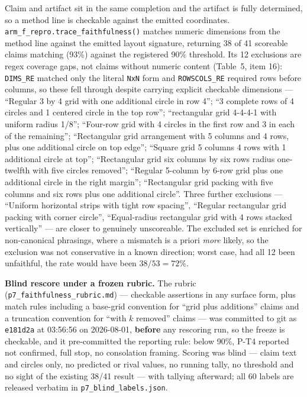 \documentclass[11pt]{article}
\begin{document}
Claim and artifact sit in the same completion and the artifact is fully determined, so a method
line is checkable against the emitted coordinates. \texttt{arm\_f\_repro.trace\_faithfulness()} matches
numeric dimensions from the method line against the emitted layout signature, returning 38 of 41
scoreable claims matching (93\%) against the registered 90\% threshold. Its 12 exclusions are regex
coverage gaps, not claims without numeric content (Table~5, item 16): \texttt{DIMS\_RE} matched only the
literal \texttt{NxN} form and \texttt{ROWSCOLS\_RE} required rows before columns, so these fell through despite
carrying explicit checkable dimensions --- ``Regular 3 by 4 grid with one additional circle in row
4''; ``3 complete rows of 4 circles and 1 centered circle in the top row''; ``rectangular grid 4-4-4-1
with uniform radius 1/8''; ``Four-row grid with 4 circles in the first row and 3 in each of the
remaining''; ``Rectangular grid arrangement with 5 columns and 4 rows, plus one additional circle on
top edge''; ``Square grid 5 columns 4 rows with 1 additional circle at top''; ``Rectangular grid six
columns by six rows radius one-twelfth with five circles removed''; ``Regular 5-column by 6-row grid
plus one additional circle in the right margin''; ``Rectangular grid packing with five columns and
six rows plus one additional circle''. Three further exclusions --- ``Uniform horizontal strips with
tight row spacing'', ``Regular rectangular grid packing with corner circle'', ``Equal-radius
rectangular grid with 4 rows stacked vertically'' --- are closer to genuinely unscoreable. The
excluded set is enriched for non-canonical phrasings, where a mismatch is a priori \textit{more} likely,
so the exclusion was not conservative in a known direction; worst case, had all 12 been
unfaithful, the rate would have been $38/53 = 72\%$.

\textbf{Blind rescore under a frozen rubric.} The rubric (\texttt{p7\_faithfulness\_rubric.md}) --- checkable
assertions in any surface form, plus match rules including a base-grid convention for ``grid plus
additions'' claims and a truncation convention for ``with $k$ removed'' claims --- was committed to git
as \texttt{e181d2a} at 03:56:56 on 2026-08-01, \textbf{before} any rescoring run, so the freeze is checkable,
and it pre-committed the reporting rule: below 90\%, P-T4 reported not confirmed, full stop, no
consolation framing. Scoring was blind --- claim text and circles only, no predicted or rival
values, no running tally, no threshold and no sight of the existing 38/41 result --- with tallying
afterward; all 60 labels are released verbatim in \texttt{p7\_blind\_labels.json}.
\end{document}
